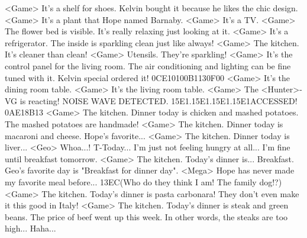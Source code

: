 <Game> It's a shelf for shoes. 
Kelvin bought it because he likes the chic design. 
<Game> It's a plant that Hope named Barnaby. 
<Game> It's a TV. 
<Game> The flower bed is visible. 
It's really relaxing just looking at it. 
<Game> It's a refrigerator. 
The inside is sparkling clean just like always! 
<Game> The kitchen. 
It's cleaner than clean! 
<Game> Utensils. 
They're sparkling! 
<Game> It's the control panel for the living room. 
The air conditioning and lighting can be fine tuned with it. 
Kelvin special ordered it! 
{0C}{E1}{01}{00}{B1}{13}{0F}{00}
<Game> It's the dining room table. 
<Game> It's the living room table. 
<Game> The <Hunter>-VG is reacting! 
NOISE WAVE DETECTED. {15}{E1}.{15}{E1}.{15}{E1}.{15}{E1}ACCESSED! 
{0A}{E1}{8B}{13}
<Game> The kitchen. 
Dinner today is chicken and mashed potatoes. 
The mashed potatoes are handmade! 
<Game> The kitchen. 
Dinner today is macaroni and cheese. 
Hope's favorite... 
<Game> The kitchen. 
Dinner today is liver... 
<Geo> Whoa...! 
T-Today... I'm just not feeling hungry at all... 
I'm fine until breakfast tomorrow. 
<Game> The kitchen. 
Today's dinner is... Breakfast. 
Geo's favorite day is "Breakfast for dinner day". 
<Mega> Hope has never made my favorite meal before... 
{13}{EC}(Who do they think I  am! The family dog!?) 
<Game> The kitchen. 
Today's dinner is pasta carbonara! 
They don't even make it this good in Italy! 
<Game> The kitchen. 
Today's dinner is steak and green beans. 
The price of beef went up this week. In other words, the steaks are too high... 
Haha... 
